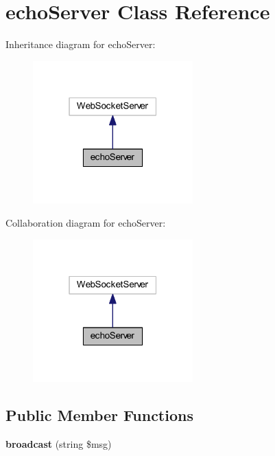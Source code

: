\section{echo\+Server Class Reference}
\label{class_lora_1_1_api_1_1echo_server}


Inheritance diagram for echo\+Server\+:\nopagebreak
\begin{figure}[H]
\begin{center}
\leavevmode
\includegraphics[width=175pt]{class_lora_1_1_api_1_1echo_server__inherit__graph}
\end{center}
\end{figure}


Collaboration diagram for echo\+Server\+:\nopagebreak
\begin{figure}[H]
\begin{center}
\leavevmode
\includegraphics[width=175pt]{class_lora_1_1_api_1_1echo_server__coll__graph}
\end{center}
\end{figure}
\subsection*{Public Member Functions}
\begin{DoxyCompactItemize}
\item 
\mbox{\label{class_lora_1_1_api_1_1echo_server_a473114c92843eda7de537f42ffde8913}} 
{\bfseries broadcast} (string \$msg)
\end{DoxyCompactItemize}
